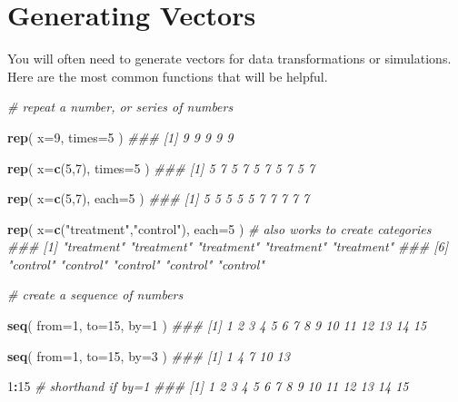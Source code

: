 \documentclass[]{book}
\newenvironment{Shaded}{\begin{snugshade}}{\end{snugshade}}
\newcommand{\CommentTok}[1]{\textcolor[rgb]{0.56,0.35,0.01}{\textit{#1}}}
\newcommand{\DataTypeTok}[1]{\textcolor[rgb]{0.13,0.29,0.53}{#1}}
\newcommand{\DecValTok}[1]{\textcolor[rgb]{0.00,0.00,0.81}{#1}}
\newcommand{\KeywordTok}[1]{\textcolor[rgb]{0.13,0.29,0.53}{\textbf{#1}}}
\newcommand{\NormalTok}[1]{#1}
\newcommand{\OperatorTok}[1]{\textcolor[rgb]{0.81,0.36,0.00}{\textbf{#1}}}
\newcommand{\StringTok}[1]{\textcolor[rgb]{0.31,0.60,0.02}{#1}}
\theoremstyle{definition}
\theoremstyle{definition}
\theoremstyle{definition}
\theoremstyle{remark}
\begin{document}
\hypertarget{generating-vectors}{%
\section{Generating Vectors}\label{generating-vectors}}

You will often need to generate vectors for data transformations or
simulations. Here are the most common functions that will be helpful.

\begin{Shaded}
\begin{Highlighting}[]

\CommentTok{# repeat a number, or series of numbers}

\KeywordTok{rep}\NormalTok{( }\DataTypeTok{x=}\DecValTok{9}\NormalTok{, }\DataTypeTok{times=}\DecValTok{5}\NormalTok{ )}
\CommentTok{### [1] 9 9 9 9 9}

\KeywordTok{rep}\NormalTok{( }\DataTypeTok{x=}\KeywordTok{c}\NormalTok{(}\DecValTok{5}\NormalTok{,}\DecValTok{7}\NormalTok{), }\DataTypeTok{times=}\DecValTok{5}\NormalTok{ )}
\CommentTok{###  [1] 5 7 5 7 5 7 5 7 5 7}

\KeywordTok{rep}\NormalTok{( }\DataTypeTok{x=}\KeywordTok{c}\NormalTok{(}\DecValTok{5}\NormalTok{,}\DecValTok{7}\NormalTok{), }\DataTypeTok{each=}\DecValTok{5}\NormalTok{ )}
\CommentTok{###  [1] 5 5 5 5 5 7 7 7 7 7}

\KeywordTok{rep}\NormalTok{( }\DataTypeTok{x=}\KeywordTok{c}\NormalTok{(}\StringTok{"treatment"}\NormalTok{,}\StringTok{"control"}\NormalTok{), }\DataTypeTok{each=}\DecValTok{5}\NormalTok{ )  }\CommentTok{# also works to create categories}
\CommentTok{###  [1] "treatment" "treatment" "treatment" "treatment" "treatment"}
\CommentTok{###  [6] "control"   "control"   "control"   "control"   "control"}


\CommentTok{# create a sequence of numbers}

\KeywordTok{seq}\NormalTok{( }\DataTypeTok{from=}\DecValTok{1}\NormalTok{, }\DataTypeTok{to=}\DecValTok{15}\NormalTok{, }\DataTypeTok{by=}\DecValTok{1}\NormalTok{ )}
\CommentTok{###  [1]  1  2  3  4  5  6  7  8  9 10 11 12 13 14 15}

\KeywordTok{seq}\NormalTok{( }\DataTypeTok{from=}\DecValTok{1}\NormalTok{, }\DataTypeTok{to=}\DecValTok{15}\NormalTok{, }\DataTypeTok{by=}\DecValTok{3}\NormalTok{ )}
\CommentTok{### [1]  1  4  7 10 13}

\DecValTok{1}\OperatorTok{:}\DecValTok{15}   \CommentTok{# shorthand if by=1}
\CommentTok{###  [1]  1  2  3  4  5  6  7  8  9 10 11 12 13 14 15}




\end{Highlighting}
\end{Shaded}
\end{document}
